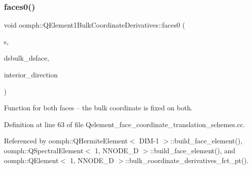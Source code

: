 \subsubsection{\texorpdfstring{faces0()}{faces0()}}
{\footnotesize\ttfamily void oomph\+::\+Q\+Element1\+Bulk\+Coordinate\+Derivatives\+::faces0 (\begin{DoxyParamCaption}\item[{const \hyperlink{classoomph_1_1Vector}{Vector}$<$ double $>$ \&}]{s,  }\item[{\hyperlink{classoomph_1_1DenseMatrix}{Dense\+Matrix}$<$ double $>$ \&}]{dsbulk\+\_\+dsface,  }\item[{unsigned \&}]{interior\+\_\+direction }\end{DoxyParamCaption})}



Function for both faces -- the bulk coordinate is fixed on both. 



Definition at line 63 of file Qelement\+\_\+face\+\_\+coordinate\+\_\+translation\+\_\+schemes.\+cc.



Referenced by oomph\+::\+Q\+Hermite\+Element$<$ D\+I\+M-\/1 $>$\+::build\+\_\+face\+\_\+element(), oomph\+::\+Q\+Spectral\+Element$<$ 1, N\+N\+O\+D\+E\+\_\+D $>$\+::build\+\_\+face\+\_\+element(), and oomph\+::\+Q\+Element$<$ 1, N\+N\+O\+D\+E\+\_\+D $>$\+::bulk\+\_\+coordinate\+\_\+derivatives\+\_\+fct\+\_\+pt().


